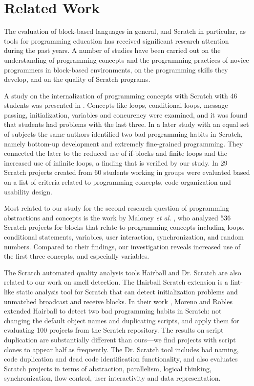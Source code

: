 \documentclass{sig-alternate}
\begin{document}
\section{Related Work}
\label{sec:related}

The evaluation of block-based languages in general, and Scratch in particular, as tools for programming education has received significant research attention during the past years. A number of studies have been carried out on the understanding of programming concepts and the programming practices of novice programmers in block-based environments, on the programming skills they develop, and on the quality of Scratch programs.

A study on the internalization of programming concepts with Scratch with 46 students was presented in \cite{meerbaum-salant_learning_2010}. Concepts like loops, conditional loops, message passing, initialization, variables and concurency were examined, and it was found that students had problems with the last three. In a later study with an equal set of subjects \cite{Meerbaum_habits_2011} the same authors identified two bad programming habits in Scratch, namely bottom-up development and extremely fine-grained programming. They connected the later to the reduced use of if-blocks and finite loops and the increased use of infinite loops, a finding that is verified by our study. In \cite{wilson_evaluation_2012} 29 Scratch projects created from 60 students working in groups were evaluated based on a list of criteria related to programming concepts, code organization and usability design.

Most related to our study for the second research question of programming abstractions and concepts is the work by Maloney \emph{et al.} \cite{Maloney_2008}, who analyzed 536 Scratch projects for blocks that relate to programming concepts including loops, conditional statements, variables, user interaction, synchronization, and random numbers. Compared to their findings, our investigation reveals increased use of the first three concepts, and especially variables.

The Scratch automated quality analysis tools Hairball \cite{boe_hairball:_2013} and Dr. Scratch \cite{moreno-leon_dr._2015} are also related to our work on smell detection. The Hairball Scratch extension is a lint-like static analysis tool for Scratch that can detect initialization problems and unmatched broadcast and receive blocks. In their work \cite{moreno_automatic_2014}, Moreno and Robles extended Hairball to detect two bad programming habits in Scratch: not changing the default object names and duplicating scripts, and apply them for evaluating 100 projects from the Scratch repository. The results on script duplication are substantially different than ours---we find projects with script clones to appear half as frequently. The Dr. Scratch tool \cite{moreno-leon_dr._2015} includes bad naming, code duplication and dead code identification functionality, and also evaluates Scratch projects in terms of abstraction, parallelism, logical thinking, synchronization, flow control, user interactivity and data representation.
\end{document}
